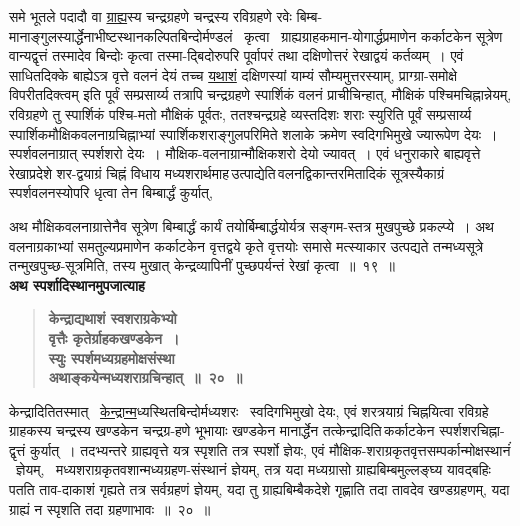 \documentclass[11pt, openany]{book}
\begin{document}
समे भूतले पदादौ वा \hyperref[4.18]{ग्राह्य}स्य चन्द्रग्रहणे चन्द्रस्य रविग्रहणे रवेः बिम्ब-मानाङ्गुलस्यार्द्धेनाभीष्टस्थानकल्पितबिन्दोर्मण्डलं ~कृत्वा ~ग्राह्यग्राहकमान-योगार्द्धप्रमाणेन कर्काटकेन सूत्रेण वान्यद्वृत्तं तस्मादेव बिन्दोः कृत्वा तस्मा-द्बिदोरुपरि पूर्वापरं तथा दक्षिणोत्तरं रेखाद्वयं कर्तव्यम्~। एवं साधितदिक्के बाह्येऽत्र वृत्ते वलनं देयं तच्च \hyperref[4.19]{यथाशं} दक्षिणस्यां याम्यं सौम्यमुत्तरस्याम्, प्राग्ग्रा-समोक्षे विपरीतदिक्त्वम् इति पूर्वं सम्प्रसार्य्य तत्रापि चन्द्रग्रहणे स्पार्शिकं वलनं प्राचीचिन्हात्, मौक्षिकं पश्चिमचिह्नान्नेयम्, रविग्रहणे तु स्पार्शिकं पश्चि-मतो मौक्षिकं पूर्वतः, ततश्चन्द्रग्रहे व्यस्तदिशः शराः स्युरिति पूर्वं सम्प्रसार्य्य स्पार्शिकमौक्षिकवलनाग्रचिह्नाभ्यां स्पार्शिकशराङ्गुलपरिमिते शलाके क्रमेण स्वदिगभिमुखे ज्यारूपेण देयः~। स्पर्शवलनाग्रात् स्पर्शशरो देयः~। मौक्षिक-वलनाग्रान्मौक्षिकशरो देयो ज्यावत्~। एवं धनुराकारे बाह्यवृत्ते रेखाप्रदेशे शर-द्वयाग्रं चिह्नं विधाय मध्यशरार्थमाह\textendash \,उत्पाद्येति\textendash \,वलनद्विकान्तरमितादिकं सूत्रस्यैकाग्रं स्पर्शवलनस्योपरि धृत्वा तेन बिम्बार्द्धं कुर्यात्,

\newpage

\noindent अथ मौक्षिकवलनाग्रात्तेनैव सूत्रेण बिम्बार्द्धं कार्यं तयोर्बिम्बार्द्धयोर्यत्र सङ्गम-स्तत्र मुखपुच्छे प्रकल्प्ये~। अथ वलनाग्रकाभ्यां समतुल्यप्रमाणेन कर्काटकेन वृत्तद्वये कृते वृत्तयोः समासे मत्स्याकार उत्पद्यते तन्मध्यसूत्रे तन्मुखपुच्छ-सूत्रमिति, तस्य मुखात् केन्द्रव्यापिनीं पुच्छपर्यन्तं रेखां कृत्वा~॥~१९~॥\\

{\small \textbf{अथ स्पर्शादिस्थानमुपजात्याह\textendash }}

 \label{4.20}
\begin{quote}
{\large \textbf{{\color{purple}केन्द्राद्यथाशं स्वशराग्रकेभ्यो \\
वृत्तैः कृतेर्ग्राहकखण्डकेन~। \\
स्युः स्पर्शमध्यग्रहमोक्षसंस्था \\
अथाङ्कयेन्मध्यशराग्रचिन्हात्~॥~२०~॥ }}}
\end{quote}

केन्द्रादिति\textendash \;तस्मात् ~\hyperref[4.20]{केन्द्रान्म}ध्यस्थितबिन्दोर्मध्यशरः ~स्वदिगभिमुखो देयः, एवं शरत्रयाग्रं चिह्नयित्वा रविग्रहे ग्राहकस्य चन्द्रस्य खण्डकेन चन्द्रग्र-हणे भूभायाः खण्डकेन मानार्द्धेन तत्केन्द्रादिति\textendash \,कर्काटकेन स्पर्शशरचिह्ना-द्वृत्तं कुर्यात्~। तदभ्यन्तरे ग्राह्यवृत्ते यत्र स्पृशति तत्र स्पर्शो ज्ञेयः, एवं मौक्षिक-शराग्रकृतवृत्तसम्पर्कान्मोक्षस्थानंं ~ज्ञेयम्, ~मध्यशराग्रकृतवशान्मध्यग्रहण-संस्थानं ज्ञेयम्, तत्र यदा मध्यग्रासो ग्राह्यबिम्बमुल्लङ्घ्य यावद्बहिः पतति ताव-दाकाशं गृह्यते तत्र सर्वग्रहणं ज्ञेयम्, यदा तु ग्राह्यबिम्बैकदेशे गृह्णाति तदा तावदेव खण्डग्रहणम्, यदा ग्राह्यं न स्पृशति तदा ग्रहणाभावः~॥~२०~॥ \\
\end{document}
